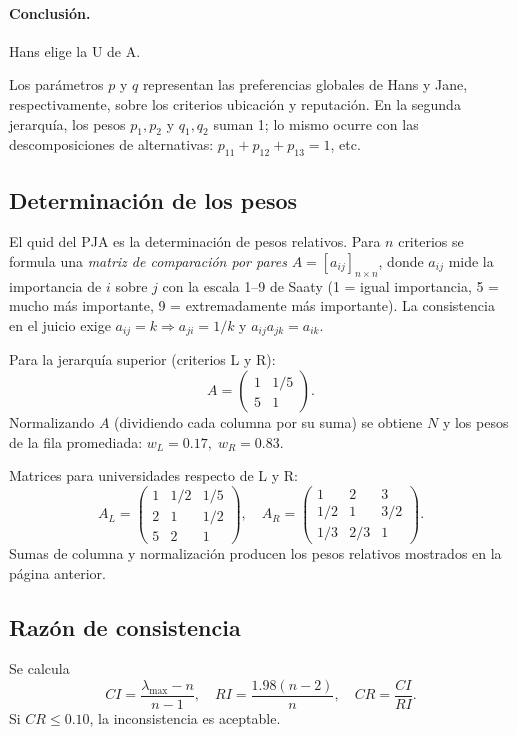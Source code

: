\documentclass[11pt]{scrartcl}
\begin{document}
\paragraph{Conclusión.} Hans elige la U de A.

Los parámetros $p$ y $q$ representan las preferencias globales de Hans y Jane, respectivamente, sobre los criterios ubicación y reputación. En la segunda jerarquía, los pesos $p_1,p_2$ y $q_1,q_2$ suman 1; lo mismo ocurre con las descomposiciones de alternativas: $p_{11}+p_{12}+p_{13}=1$, etc.

\subsection{Determinación de los pesos}
El quid del PJA es la determinación de pesos relativos. Para $n$ criterios se formula una \textit{matriz de comparación por pares} $A=[a_{ij}]_{n\times n}$, donde $a_{ij}$ mide la importancia de $i$ sobre $j$ con la escala 1–9 de Saaty (1 = igual importancia, 5 = mucho más importante, 9 = extremadamente más importante). La consistencia en el juicio exige $a_{ij}=k\Rightarrow a_{ji}=1/k$ y $a_{ij}a_{jk}=a_{ik}$.

\begin{example}
Para la jerarquía superior (criterios L y R):
\[A=\begin{pmatrix}1 & 1/5\\ 5 & 1\end{pmatrix}.\]
Normalizando $A$ (dividiendo cada columna por su suma) se obtiene $N$ y los pesos de la fila promediada: $w_L=0.17,\;w_R=0.83$.
\end{example}

Matrices para universidades respecto de L y R:
\[A_L=\begin{pmatrix}1 & 1/2 & 1/5\\ 2 & 1 & 1/2\\ 5 & 2 & 1\end{pmatrix},\quad A_R=\begin{pmatrix}1 & 2 & 3\\ 1/2 & 1 & 3/2\\ 1/3 & 2/3 & 1\end{pmatrix}.\]
Sumas de columna y normalización producen los pesos relativos mostrados en la página anterior.

\subsection*{Razón de consistencia}
Se calcula
\[CI=\frac{\lambda_{\max}-n}{n-1},\quad RI=\frac{1.98(n-2)}{n},\quad CR=\frac{CI}{RI}.\]
Si $CR\le0.10$, la inconsistencia es aceptable.
\end{document}
